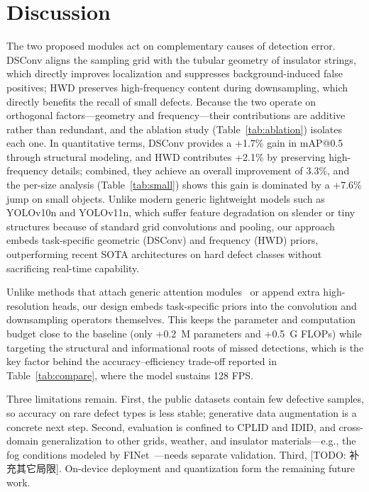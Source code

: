 \documentclass[sensors,article,submit,pdftex,moreauthors]{Definitions/mdpi}
\begin{document}
\section{Discussion}\label{sec:discussion}

The two proposed modules act on complementary causes of detection error. DSConv aligns the sampling grid with the tubular geometry of insulator strings, which directly improves localization and suppresses background-induced false positives; HWD preserves high-frequency content during downsampling, which directly benefits the recall of small defects. Because the two operate on orthogonal factors---geometry and frequency---their contributions are additive rather than redundant, and the ablation study (Table~\ref{tab:ablation}) isolates each one. In quantitative terms, DSConv provides a +1.7\% gain in mAP@0.5 through structural modeling, and HWD contributes +2.1\% by preserving high-frequency details; combined, they achieve an overall improvement of 3.3\%, and the per-size analysis (Table~\ref{tab:small}) shows this gain is dominated by a +7.6\% jump on small objects. Unlike modern generic lightweight models such as YOLOv10n and YOLOv11n, which suffer feature degradation on slender or tiny structures because of standard grid convolutions and pooling, our approach embeds task-specific geometric (DSConv) and frequency (HWD) priors, outperforming recent SOTA architectures on hard defect classes without sacrificing real-time capability.

Unlike methods that attach generic attention modules~\cite{hu2018squeeze,woo2018cbam,hou2021coordinate} or append extra high-resolution heads, our design embeds task-specific priors into the convolution and downsampling operators themselves. This keeps the parameter and computation budget close to the baseline (only +0.2~M parameters and +0.5~G FLOPs) while targeting the structural and informational roots of missed detections, which is the key factor behind the accuracy--efficiency trade-off reported in Table~\ref{tab:compare}, where the model sustains 128 FPS.

Three limitations remain. First, the public datasets contain few defective samples, so accuracy on rare defect types is less stable; generative data augmentation is a concrete next step. Second, evaluation is confined to CPLID and IDID, and cross-domain generalization to other grids, weather, and insulator materials---e.g., the fog conditions modeled by FINet~\cite{zhang2022finet}---needs separate validation. Third, [TODO: 补充其它局限]. On-device deployment and quantization form the remaining future work.
\end{document}
